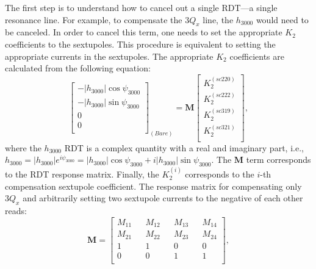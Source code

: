 The first step is to understand how to cancel out a single RDT---a single resonance line. For example, to compensate the $3Q_x$ line, the $h_{3000}$ would need to be canceled. In order to cancel this term, one needs to set the appropriate $K_2$ coefficients to the sextupoles. This procedure is equivalent to setting the appropriate currents in the sextupoles. The appropriate $K_2$ coefficients are calculated from the following equation:
\begin{equation}
    \begin{bmatrix}
        -|h_{3000}| \cos \psi_{3000} \\
        -|h_{3000}| \sin \psi_{3000} \\
        0 \\
        0 \\
        \end{bmatrix}_{(Bare)}
         =
        \boldsymbol{M}
        \begin{bmatrix}
        K_2^{(sc220)} \\
        K_2^{(sc222)}\\
        K_2^{(sc319)} \\
        K_2^{(sc321)}\\
        \end{bmatrix},
        \label{eq:model1}
\end{equation}
where the $h_{3000}$ RDT is a complex quantity with a real and imaginary part, i.e., $h_{3000}= \left| h_{3000}\right|e^{i \psi_{3000}} = |h_{3000}| \cos \psi_{3000} + i |h_{3000}| \sin \psi_{3000}$. The $\boldsymbol{M}$ term corresponds to the RDT response matrix. Finally, the $K_2^{(i)}$ corresponds to the $i$-th compensation sextupole coefficient. The response matrix for compensating only $3Q_x$ and arbitrarily setting two sextupole currents to the negative of each other reads:
\begin{equation}
    \boldsymbol{M} = 
\begin{bmatrix}

M_{11} && M_{12} && M_{13} && M_{14}  \\ 

M_{21} && M_{22} && M_{23} && M_{24} \\ 

1 && 1 && 0 && 0 \\ 

0 && 0 && 1 && 1 \\

\end{bmatrix},
\label{eq:rm1}
\end{equation}
